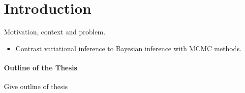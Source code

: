 \chapter*{Introduction}

Motivation, context and problem.


\begin{itemize}
    \item Contrast variational inference to Bayesian inference with MCMC methods.
\end{itemize}   



\subsubsection*{Outline of the Thesis}
Give outline of thesis %
